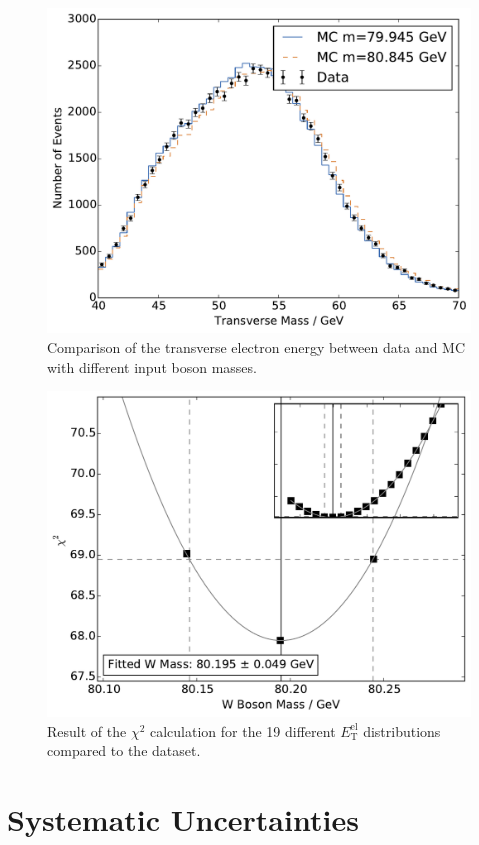 \documentclass[
	paper=A4,
	parskip=full,
	chapterprefix=true,
	11pt,
	headings=normal,
	bibliography=totoc,
	listof=totoc,
	titlepage=on,
]{scrreprt}
\newcommand{\ELET}{\ensuremath{{E_\mathrm{T}^\mathrm{el}}}\xspace}
\begin{document}
\begin{figure}
	\centering
	\includegraphics{comparison_m_t}
	\caption{Comparison of the transverse electron energy between data and MC with different input \PW boson masses.}
	\label{fig:comparison_el_et}
\end{figure}


\begin{figure}
	\centering
	\includegraphics{chisquare_m_t}
	\caption{Result of the $\chi^2$ calculation for the 19 different \ELET distributions compared to the dataset.}
	\label{fig:chisquare_el_et}
\end{figure}

\section{Systematic Uncertainties}
\end{document}
